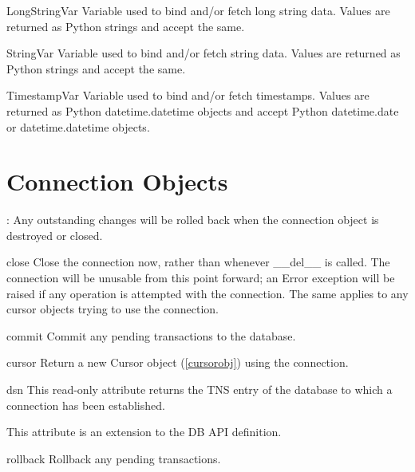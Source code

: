 \documentclass{manual}
\begin{document}
\begin{datadesc}{LongStringVar}
  Variable used to bind and/or fetch long string data. Values are returned as
  Python strings and accept the same.
\end{datadesc}

\begin{datadesc}{StringVar}
  Variable used to bind and/or fetch string data. Values are returned as Python
  strings and accept the same.
\end{datadesc}

\begin{datadesc}{TimestampVar}
  Variable used to bind and/or fetch timestamps. Values are returned as Python
  datetime.datetime objects and accept Python datetime.date or
  datetime.datetime objects.
\end{datadesc}

\chapter{Connection Objects\label{connobj}}

: Any outstanding changes will be rolled back when the connection
object is destroyed or closed.

\begin{funcdesc}{close}{}
  Close the connection now, rather than whenever __del__ is called. The
  connection will be unusable from this point forward; an Error exception will
  be raised if any operation is attempted with the connection. The same applies
  to any cursor objects trying to use the connection.
\end{funcdesc}

\begin{funcdesc}{commit}{}
  Commit any pending transactions to the database.
\end{funcdesc}

\begin{funcdesc}{cursor}{}
  Return a new Cursor object (\ref{cursorobj}) using the connection.
\end{funcdesc}

\begin{datadesc}{dsn}
  This read-only attribute returns the TNS entry of the database to which a
  connection has been established.

   This attribute is an extension to the DB API definition.
\end{datadesc}

\begin{funcdesc}{rollback}{}
  Rollback any pending transactions.
\end{funcdesc}
\end{document}
